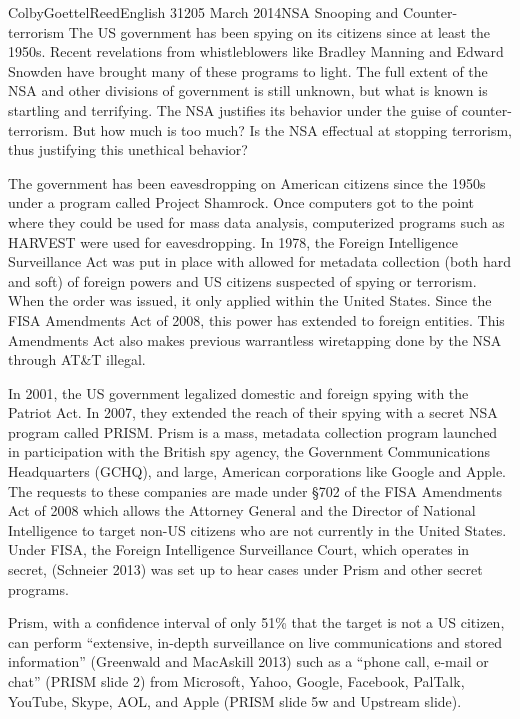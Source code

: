 \documentclass[12pt]{article}
\begin{document}
\begin{mla}{Colby}{Goettel}{Reed}{English 312}{05 March 2014}{NSA Snooping and Counter-terrorism}
The US government has been spying on its citizens since at least the 1950s. Recent revelations from whistleblowers like Bradley Manning and Edward Snowden have brought many of these programs to light. The full extent of the NSA and other divisions of government is still unknown, but what is known is startling and terrifying. The NSA justifies its behavior under the guise of counter-terrorism. But how much is too much? Is the NSA effectual at stopping terrorism, thus justifying this unethical behavior?

The government has been eavesdropping on American citizens since the 1950s under a program called Project Shamrock. Once computers got to the point where they could be used for mass data analysis, computerized programs such as HARVEST were used for eavesdropping. In 1978, the Foreign Intelligence Surveillance Act was put in place with allowed for metadata collection (both hard and soft) of foreign powers and US citizens suspected of spying or terrorism. When the order was issued, it only applied within the United States. Since the FISA Amendments Act of 2008, this power has extended to foreign entities. This Amendments Act also makes previous warrantless wiretapping done by the NSA through AT\&T illegal.

In 2001, the US government legalized domestic and foreign spying with the Patriot Act. In 2007, they extended the reach of their spying with a secret NSA program called PRISM. Prism is a mass, metadata collection program launched in participation with the British spy agency, the Government Communications Headquarters (GCHQ), and large, American corporations like Google and Apple. The requests to these companies are made under \S702 of the FISA Amendments Act of 2008 which allows the Attorney General and the Director of National Intelligence to target non-US citizens who are not currently in the United States. Under FISA, the Foreign Intelligence Surveillance Court, which operates in secret, (Schneier 2013) was set up to hear cases under Prism and other secret programs.

Prism, with a confidence interval of only 51\% that the target is not a US citizen, can perform ``extensive, in-depth surveillance on live communications and stored information'' (Greenwald and MacAskill 2013) such as a ``phone call, e-mail or chat'' (PRISM slide 2) from Microsoft, Yahoo, Google, Facebook, PalTalk, YouTube, Skype, AOL, and Apple (PRISM slide 5w and Upstream slide).


\end{mla}
\end{document}
